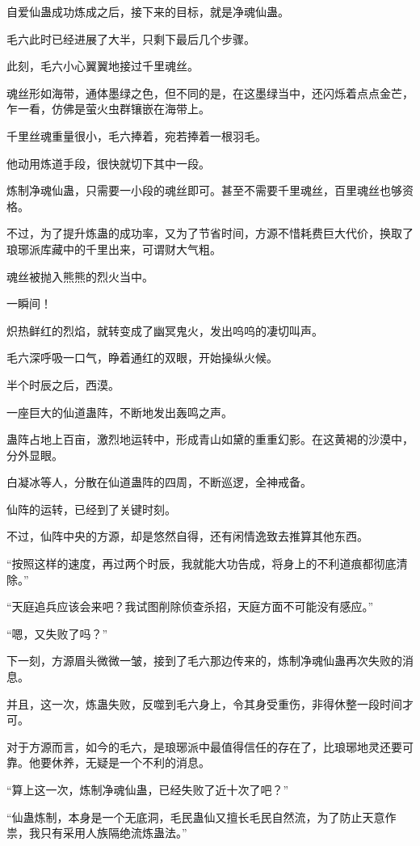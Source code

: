 \begin{this_body}
自爱仙蛊成功炼成之后，接下来的目标，就是净魂仙蛊。

毛六此时已经进展了大半，只剩下最后几个步骤。

此刻，毛六小心翼翼地接过千里魂丝。

魂丝形如海带，通体墨绿之色，但不同的是，在这墨绿当中，还闪烁着点点金芒，乍一看，仿佛是萤火虫群镶嵌在海带上。

千里丝魂重量很小，毛六捧着，宛若捧着一根羽毛。

他动用炼道手段，很快就切下其中一段。

炼制净魂仙蛊，只需要一小段的魂丝即可。甚至不需要千里魂丝，百里魂丝也够资格。

不过，为了提升炼蛊的成功率，又为了节省时间，方源不惜耗费巨大代价，换取了琅琊派库藏中的千里出来，可谓财大气粗。

魂丝被抛入熊熊的烈火当中。

一瞬间！

炽热鲜红的烈焰，就转变成了幽冥鬼火，发出呜呜的凄切叫声。

毛六深呼吸一口气，睁着通红的双眼，开始操纵火候。

半个时辰之后，西漠。

一座巨大的仙道蛊阵，不断地发出轰鸣之声。

蛊阵占地上百亩，激烈地运转中，形成青山如黛的重重幻影。在这黄褐的沙漠中，分外显眼。

白凝冰等人，分散在仙道蛊阵的四周，不断巡逻，全神戒备。

仙阵的运转，已经到了关键时刻。

不过，仙阵中央的方源，却是悠然自得，还有闲情逸致去推算其他东西。

“按照这样的速度，再过两个时辰，我就能大功告成，将身上的不利道痕都彻底清除。”

“天庭追兵应该会来吧？我试图削除侦查杀招，天庭方面不可能没有感应。”

“嗯，又失败了吗？”

下一刻，方源眉头微微一皱，接到了毛六那边传来的，炼制净魂仙蛊再次失败的消息。

并且，这一次，炼蛊失败，反噬到毛六身上，令其身受重伤，非得休整一段时间才可。

对于方源而言，如今的毛六，是琅琊派中最值得信任的存在了，比琅琊地灵还要可靠。他要休养，无疑是一个不利的消息。

“算上这一次，炼制净魂仙蛊，已经失败了近十次了吧？”

“仙蛊炼制，本身是一个无底洞，毛民蛊仙又擅长毛民自然流，为了防止天意作祟，我只有采用人族隔绝流炼蛊法。”


\end{this_body}

